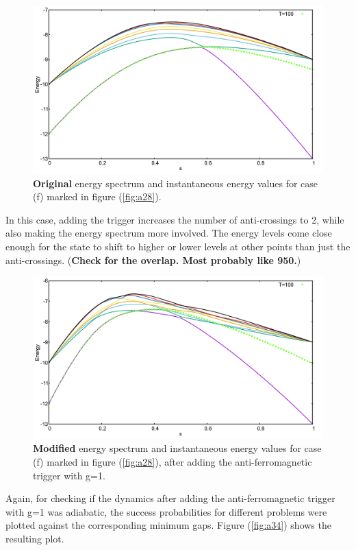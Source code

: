 \documentclass[../main.tex]{subfiles}
\begin{document}
\begin{figure}[H]
\centering 
\includegraphics[scale=0.3]{969_O_T100.png}
\caption{\textbf{Original} energy spectrum and instantaneous energy values for case (f) marked in figure (\ref{fig:a28}).}
\label{fig:a32}
\end{figure}
In this case, adding the trigger increases the number of anti-crossings to 2, while also making the energy spectrum more involved. The energy levels come close enough for the state to shift to higher or lower levels at other points than just the anti-crossings. (\textbf{Check for the overlap. Most probably like 950.})
\begin{figure}[H]
\centering 
\includegraphics[scale=0.3]{969_A_T100_g1.png}
\caption{\textbf{Modified} energy spectrum and instantaneous energy values for case (f) marked in figure (\ref{fig:a28}), after adding the anti-ferromagnetic trigger with g=1.}
\label{fig:a33}
\end{figure}

Again, for checking if the dynamics after adding the anti-ferromagnetic trigger with g=1 was adiabatic, the success probabilities for different problems were plotted against the corresponding minimum gaps. Figure (\ref{fig:a34}) shows the resulting plot.
\end{document}
